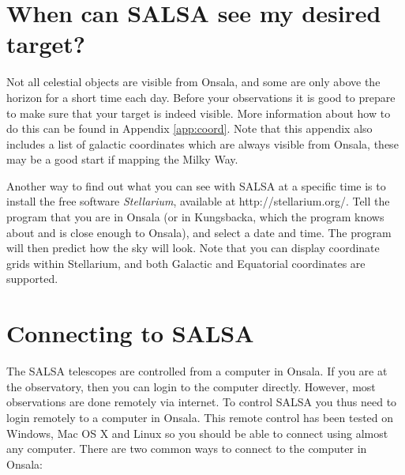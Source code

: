 %

\section{When can SALSA see my desired target?}
Not all celestial objects are visible from Onsala, and some are only above the
horizon for a short time each day. Before your observations it is good to
prepare to make sure that your target is indeed visible. More information about
how to do this can be found in Appendix \ref{app:coord}. Note that this
appendix also includes a list of galactic coordinates which are always visible
from Onsala, these may be a good start if mapping the Milky Way. 

Another way to find out what you can see with SALSA at a specific time is to
install the free software \emph{Stellarium}, available at
http://stellarium.org/.  Tell the program that you are in Onsala (or in
Kungsbacka, which the program knows about and is close enough to Onsala), and
select a date and time.  The program will then predict how the sky will look.
Note that you can display coordinate grids within Stellarium, and both Galactic
and Equatorial coordinates are supported.

\section{Connecting to SALSA} 
\label{sect:connect}
The SALSA telescopes are controlled from a computer in Onsala. If you are at
the observatory, then you can login to the computer directly. However, most
observations are done remotely via internet. To control SALSA you thus need to
login remotely to a computer in Onsala. This remote control has been tested
on Windows, Mac OS X and Linux so you should be able to connect using almost
any computer. There are two common ways to connect to the computer in Onsala:


